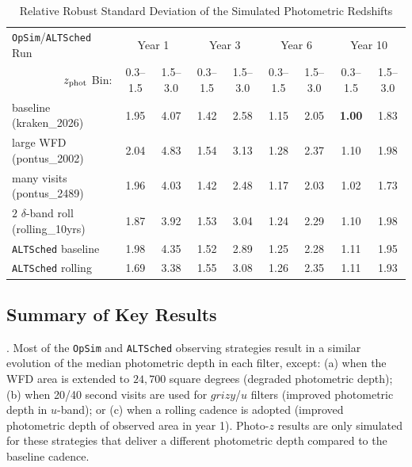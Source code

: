 \begin{table}\label{tab:zbins}
\caption{Relative Robust Standard Deviation of the Simulated Photometric Redshifts}
\begin{center}
\begin{tabular}{|l|cc|cc|cc|cc|}
\hline
{\tt OpSim}/{\tt ALTSched} Run & \multicolumn{2}{|c|}{Year 1} & \multicolumn{2}{|c|}{Year 3} & \multicolumn{2}{|c|}{Year 6} & \multicolumn{2}{|c|}{Year 10} \\ 
\multicolumn{1}{|r|}{$z_{\rm phot}$ Bin:} & 0.3--1.5 & 1.5--3.0 & 0.3--1.5 & 1.5--3.0 & 0.3--1.5 & 1.5--3.0 & 0.3--1.5 & 1.5--3.0 \\
\hline
baseline (kraken\_2026)                 & 1.95 & 4.07 & 1.42 & 2.58 & 1.15 & 2.05 & {\bf 1.00} & 1.83 \\ 
large WFD (pontus\_2002)                & 2.04 & 4.83 & 1.54 & 3.13 & 1.28 & 2.37 & 1.10 & 1.98 \\
many visits (pontus\_2489)              & 1.96 & 4.03 & 1.42 & 2.48 & 1.17 & 2.03 & 1.02 & 1.73 \\
$2$ $\delta$-band roll (rolling\_10yrs) & 1.87 & 3.92 & 1.53 & 3.04 & 1.24 & 2.29 & 1.10 & 1.98 \\
{\tt ALTSched} baseline                       & 1.98 & 4.35 & 1.52 & 2.89 & 1.25 & 2.28 & 1.11 & 1.95 \\
{\tt ALTSched} rolling                        & 1.69 & 3.38 & 1.55 & 3.08 & 1.26 & 2.35 & 1.11 & 1.93 \\
\hline
\end{tabular}
\end{center}
\end{table}


\subsection{Summary of Key Results} \label{ssec:pz_execsum}

. Most of the {\tt OpSim} and {\tt ALTSched} observing strategies result in a similar evolution of the median photometric depth in each filter, except: (a) when the WFD area is extended to $24,700$ square degrees (degraded photometric depth); (b) when 20/40 second visits are used for $grizy$/$u$ filters (improved photometric depth in $u$-band); or (c) when a rolling cadence is adopted (improved photometric depth of observed area in year 1). Photo-$z$ results are only simulated for these strategies that deliver a different photometric depth compared to the baseline cadence.

